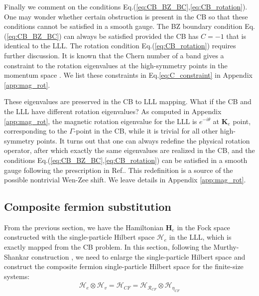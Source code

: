 Finally we comment on the conditions Eq.(\ref{eq:CB_BZ_BC},\ref{eq:CB_rotation}). One may wonder whether certain obstruction is present in the CB so that these conditions cannot be satisfied in a smooth gauge. The BZ boundary condition Eq.(\ref{eq:CB_BZ_BC}) can always be satisfied provided the CB has $C=-1$ that is identical to the LLL. The rotation condition Eq.(\ref{eq:CB_rotation}) requires further discussion. It is known that the Chern number of a band gives a constraint to the rotation eigenvalues at the high-symmetry points in the momentum space \cite{fang2012bulk}. We list these constraints in Eq.\eqref{eq:C_constraint} in Appendix \ref{app:mag_rot}.

These eigenvalues are preserved in the CB to LLL mapping. What if the CB and the LLL have different rotation eigenvalues? As computed in Appendix \ref{app:mag_rot}, the magnetic rotation eigenvalue for the LLL is $e^{-i\theta}$ at $\mathbf K_e$ point, corresponding to the $\Gamma$-point in the CB, while it is trivial for all other high-symmetry points. It turns out that one can always redefine the physical rotation operator, after which exactly the same eigenvalues are realized in the CB, and the conditions Eq.(\ref{eq:CB_BZ_BC},\ref{eq:CB_rotation}) can be satisfied in a smooth gauge following the prescription in Ref.\cite{jian2013crystal}. This redefinition is a source of the possible nontrivial Wen-Zee shift. We leave details in Appendix \ref{app:mag_rot}.

\subsection{Composite fermion substitution}\label{sec:CF_substitution}
From the previous section, we have the Hamiltonian $\mathbf H_e$ in the Fock space constructed with the single-particle Hilbert space $\mathcal H_e$ in the LLL, which is exactly mapped from the CB problem. In this section, following the Murthy-Shankar construction \cite{murthy2003hamiltonian}, we need to enlarge the single-particle Hilbert space and construct the composite fermion single-particle Hilbert space for the finite-size systems:
\begin{align}
    \mathcal H_e\otimes \mathcal H_v=\mathcal H_{CF}=\mathcal H_{\mathcal R_{CF}}\otimes \mathcal H_{\eta_{CF}}\label{eq:Hilbert_decomposition}
\end{align}

